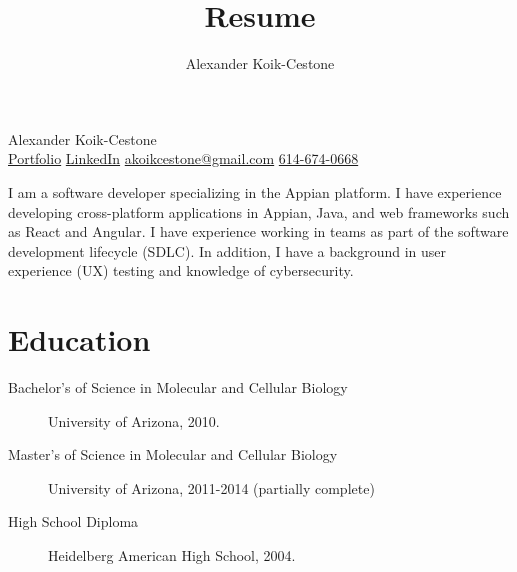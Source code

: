 \documentclass{article}
\author{Alexander Koik-Cestone}
\title{Resume}
\begin{document}
\begin{center}
{\huge Alexander Koik-Cestone\vspace{0.3cm}} \\
\href{https://sirkoik.github.io#portfolio}{Portfolio}
\textcolor{gray}{\textbullet}
\href{https://www.linkedin.com/in/alexander-koik-cestone-89304556/}{LinkedIn}
\textcolor{gray}{\textbullet}
\href{mailto:akoikcestone@gmail.com}{akoikcestone@gmail.com}
\textcolor{gray}{\textbullet}
\href{tel:614-674-0668}{614-674-0668} \\
\end{center}

\noindent
I am a software developer specializing in the Appian platform. I have experience developing cross-platform applications in Appian, Java, and web frameworks such as React and Angular. I have experience working in teams as part of the software development lifecycle (SDLC). In addition, I have a background in user experience (UX) testing and knowledge of cybersecurity.

\section*{Education}\vspace{-0.5em}
\begin{description}
  \item[Bachelor's of Science in Molecular and Cellular Biology] University of Arizona, 2010.
  \item[Master's of Science in Molecular and Cellular Biology] University of Arizona, 2011-2014 (partially complete)
  \item[High School Diploma] Heidelberg American High School, 2004.
\end{description}

\vspace{-1em}
\end{document}
